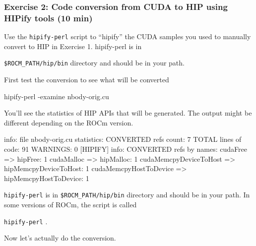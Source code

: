 \documentclass[
]{article}
\let\oldtexttt\texttt
\renewcommand{\texttt}[1]{
  \colorbox{Light}{\oldtexttt{#1}}
}
\newenvironment{Shaded}{}{}
\newcommand{\ExtensionTok}[1]{#1}
\newcommand{\NormalTok}[1]{#1}
\newcommand{\OperatorTok}[1]{\textcolor[rgb]{0.40,0.40,0.40}{#1}}
\newcommand{\StringTok}[1]{\textcolor[rgb]{0.25,0.44,0.63}{#1}}
\begin{document}
\hypertarget{exercise-2-code-conversion-from-cuda-to-hip-using-hipify-tools-10-min}{%
\subsubsection{Exercise 2: Code conversion from CUDA to HIP using HIPify
tools (10
min)}\label{exercise-2-code-conversion-from-cuda-to-hip-using-hipify-tools-10-min}}

Use the \texttt{hipify-perl} script to ``hipify'' the CUDA samples you
used to manually convert to HIP in Exercise 1. hipify-perl is in
\texttt{\$ROCM\_PATH/hip/bin} directory and should be in your path.

First test the conversion to see what will be converted

\begin{Shaded}
\begin{Highlighting}[]
\ExtensionTok{hipify{-}perl}\NormalTok{ {-}examine nbody{-}orig.cu}
\end{Highlighting}
\end{Shaded}

You'll see the statistics of HIP APIs that will be generated. The output
might be different depending on the ROCm version.

\begin{Shaded}
\begin{Highlighting}[]
\NormalTok{[}\ExtensionTok{HIPIFY}\NormalTok{] info: file }\StringTok{\textquotesingle{}nbody{-}orig.cu\textquotesingle{}}\NormalTok{ statistics:}
  \ExtensionTok{CONVERTED}\NormalTok{ refs count: 7}
  \ExtensionTok{TOTAL}\NormalTok{ lines of code: 91}
  \ExtensionTok{WARNINGS}\NormalTok{: 0}
\NormalTok{[}\ExtensionTok{HIPIFY}\NormalTok{] info: CONVERTED refs by names:}
  \ExtensionTok{cudaFree}\NormalTok{ =}\OperatorTok{\textgreater{}}\NormalTok{ hipFree: 1}
  \ExtensionTok{cudaMalloc}\NormalTok{ =}\OperatorTok{\textgreater{}}\NormalTok{ hipMalloc: 1}
  \ExtensionTok{cudaMemcpyDeviceToHost}\NormalTok{ =}\OperatorTok{\textgreater{}}\NormalTok{ hipMemcpyDeviceToHost: 1}
  \ExtensionTok{cudaMemcpyHostToDevice}\NormalTok{ =}\OperatorTok{\textgreater{}}\NormalTok{ hipMemcpyHostToDevice: 1}
\end{Highlighting}
\end{Shaded}

\texttt{hipify-perl} is in \texttt{\$ROCM\_PATH/hip/bin} directory and
should be in your path. In some versions of ROCm, the script is called
\texttt{hipify-perl}.

Now let's actually do the conversion.
\end{document}
